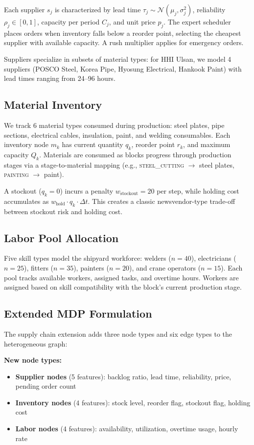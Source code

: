 \documentclass[11pt,a4paper]{article}
\begin{document}
Each supplier $s_j$ is characterized by lead time $\tau_j \sim \mathcal{N}(\mu_j, \sigma_j^2)$, reliability $\rho_j \in [0,1]$, capacity per period $C_j$, and unit price $p_j$. The expert scheduler places orders when inventory falls below a reorder point, selecting the cheapest supplier with available capacity. A rush multiplier applies for emergency orders.

Suppliers specialize in subsets of material types: for HHI Ulsan, we model 4 suppliers (POSCO Steel, Korea Pipe, Hyosung Electrical, Hankook Paint) with lead times ranging from 24--96 hours.

\subsection{Material Inventory}

We track 6 material types consumed during production: steel plates, pipe sections, electrical cables, insulation, paint, and welding consumables. Each inventory node $m_k$ has current quantity $q_k$, reorder point $r_k$, and maximum capacity $Q_k$. Materials are consumed as blocks progress through production stages via a stage-to-material mapping (e.g., \textsc{steel\_cutting} $\to$ steel plates, \textsc{painting} $\to$ paint).

A stockout ($q_k = 0$) incurs a penalty $w_{\text{stockout}} = 20$ per step, while holding cost accumulates as $w_{\text{hold}} \cdot q_k \cdot \Delta t$. This creates a classic newsvendor-type trade-off between stockout risk and holding cost.

\subsection{Labor Pool Allocation}

Five skill types model the shipyard workforce: welders ($n=40$), electricians ($n=25$), fitters ($n=35$), painters ($n=20$), and crane operators ($n=15$). Each pool tracks available workers, assigned tasks, and overtime hours. Workers are assigned based on skill compatibility with the block's current production stage.

\subsection{Extended MDP Formulation}

The supply chain extension adds three node types and six edge types to the heterogeneous graph:

\textbf{New node types:}
\begin{itemize}
    \item \textbf{Supplier nodes} (5 features): backlog ratio, lead time, reliability, price, pending order count
    \item \textbf{Inventory nodes} (4 features): stock level, reorder flag, stockout flag, holding cost
    \item \textbf{Labor nodes} (4 features): availability, utilization, overtime usage, hourly rate
\end{itemize}
\end{document}
